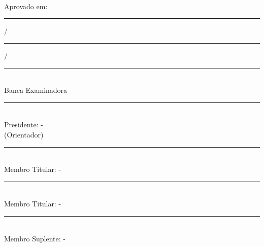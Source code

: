 \begin{titlepage}
  \begin{center}
    \bf{\MakeUppercase{
      \large{\autor}\\
      \vspace*{1cm}
      \small{
        \titulo\\
        \subtitulo\\
      }
    }}
  \end{center}
  \vspace*{1cm}
  \begin{addmargin}[6cm]{0cm}
    \justify{
      \hspace*{.5cm} \natureza
    }
  \end{addmargin}
  \vspace*{0.5cm}
  \begin{center}
    Aprovado em: \rule{1cm}{0.1pt} / \rule{1cm}{0.1pt} / \rule{1cm}{0.1pt}\\
    \vspace*{0.5cm}
    Banca Examinadora\\
    \vspace*{0.5cm}
    \rule{\textwidth}{0.1pt}\\
    Presidente: \orientador - \instituicaoorientador\\
    (Orientador)\\
    \vspace*{0.5cm}
    \rule{\textwidth}{0.1pt}\\
    Membro Titular: \membrotitularum - \instituicaomembrotitularum\\
    \vspace*{0.5cm}
    \rule{\textwidth}{0.1pt}\\
    Membro Titular: \membrotitulardois - \instituicaomembrotitulardois\\
    \vspace*{0.5cm}
    \rule{\textwidth}{0.1pt}\\
    Membro Suplente: \membrosuplente - \instituicaomembrosuplente\\
    \vspace*{0.5cm}
    \large{\bf{\MakeUppercase{
      \local\\
      \data\\
    }}}
  \end{center}
\end{titlepage}
